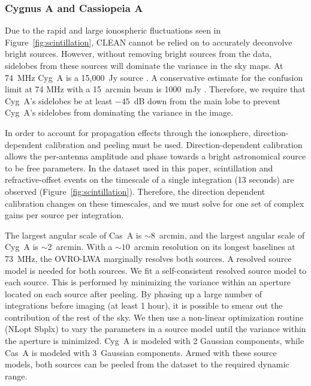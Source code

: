 \documentclass[twocolumn]{aastex61}
\begin{document}
\subsubsection{Cygnus A and Cassiopeia A}

Due to the rapid and large ionospheric fluctuations seen in Figure~\ref{fig:scintillation}, CLEAN
cannot be relied on to accurately deconvolve bright sources.  However, without removing bright
sources from the data, sidelobes from these sources will dominate the variance in the sky maps.  At
74~MHz Cyg~A is a 15,000~Jy source \citep{1977A&A....61...99B}. A conservative estimate for the
confusion limit at 74 MHz with a 15~arcmin beam is 1000~mJy \citep{2014MNRAS.440..327L}. Therefore,
we require that Cyg~A's sidelobes be at least $-45$~dB down from the main lobe to prevent Cyg~A's
sidelobes from dominating the variance in the image.

In order to account for propagation effects through the ionosphere, direction-dependent calibration
and peeling \citep{2008ISTSP...2..707M, 2015MNRAS.449.2668S} must be used.  Direction-dependent
calibration allows the per-antenna amplitude and phase towards a bright astronomical source to be
free parameters. In the dataset used in this paper, scintillation and refractive-offset events on
the timescale of a single integration (13 seconds) are observed (Figure~\ref{fig:scintillation}).
Therefore, the direction dependent calibration changes on these timescales, and we must solve for
one set of complex gains per source per integration.

The largest angular scale of Cas~A is $\sim$8~arcmin, and the largest angular scale of Cyg~A is
$\sim$2~arcmin. With a $\sim10$~arcmin resolution on its longest baselines at 73~MHz, the OVRO-LWA
marginally resolves both sources. A resolved source model is needed for both sources. We fit a
self-consistent resolved source model to each source. This is performed by minimizing the variance
within an aperture located on each source after peeling. By phasing up a large number of
integrations before imaging (at least 1 hour), it is possible to smear out the contribution of the
rest of the sky.  We then use a non-linear optimization routine (NLopt Sbplx) \citep{nlopt, sbplx}
to vary the parameters in a source model until the variance within the aperture is minimized. Cyg~A
is modeled with 2 Gaussian components, while Cas~A is modeled with 3~Gaussian components. Armed with
these  source models, both sources can be peeled from the dataset to the required dynamic range.
\end{document}
